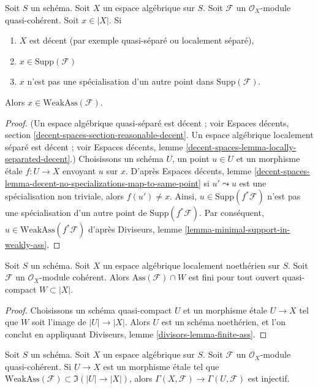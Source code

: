 \begin{lemma}
\label{lemma-minimal-support-in-weakly-ass-decent}
Soit $S$ un schéma. Soit $X$ un espace algébrique sur $S$.
Soit $\mathcal{F}$ un $\mathcal{O}_X$-module quasi-cohérent.
Soit $x \in |X|$. Si
\begin{enumerate}
\item $X$ est décent (par exemple quasi-séparé ou localement séparé),
\item $x \in \text{Supp}(\mathcal{F})$
\item $x$ n'est pas une spécialisation d'un autre point dans
$\text{Supp}(\mathcal{F})$.
\end{enumerate}
Alors $x \in \text{WeakAss}(\mathcal{F})$.
\end{lemma}

\begin{proof}
(Un espace algébrique quasi-séparé est décent ; voir
Espaces décents, section \ref{decent-spaces-section-reasonable-decent}.
Un espace algébrique localement séparé est décent ; voir
Espaces décents, lemme \ref{decent-spaces-lemma-locally-separated-decent}.)
Choisissons un schéma $U$, un point $u \in U$ et un morphisme \'etale
$f : U \to X$ envoyant $u$ sur $x$. D'après
Espaces décents, lemme
\ref{decent-spaces-lemma-decent-no-specializations-map-to-same-point}
si $u' \leadsto u$ est une spécialisation non triviale, alors
$f(u') \not = x$. Ainsi, $u \in \text{Supp}(f^*\mathcal{F})$
n'est pas une spécialisation d'un autre point de
$\text{Supp}(f^*\mathcal{F})$.
Par conséquent, $u \in \text{WeakAss}(f^*\mathcal{F})$ d'après
Diviseurs, lemme \ref{lemma-minimal-support-in-weakly-ass}.
\end{proof}

\begin{lemma}
\label{lemma-finite-ass}
Soit $S$ un schéma. Soit $X$ un espace algébrique localement noethérien sur $S$.
Soit $\mathcal{F}$ un $\mathcal{O}_X$-module cohérent.
Alors $\text{Ass}(\mathcal{F}) \cap W$ est fini pour
tout ouvert quasi-compact $W \subset |X|$.
\end{lemma}

\begin{proof}
Choisissons un schéma quasi-compact $U$ et un morphisme \'etale $U \to X$
tel que $W$ soit l'image de $|U| \to |X|$. Alors $U$ est un
schéma noethérien, et l'on conclut en appliquant
Diviseurs, lemme \ref{divisors-lemma-finite-ass}.
\end{proof}

\begin{lemma}
\label{lemma-restriction-injective-open-contains-weakly-ass}
Soit $S$ un schéma. Soit $X$ un espace algébrique sur $S$.
Soit $\mathcal{F}$ un $\mathcal{O}_X$-module quasi-cohérent.
Si $U \to X$ est un morphisme \'etale tel que
$\text{WeakAss}(\mathcal{F}) \subset \Im(|U| \to |X|)$, alors
$\Gamma(X, \mathcal{F}) \to \Gamma(U, \mathcal{F})$ est injectif.
\end{lemma}

